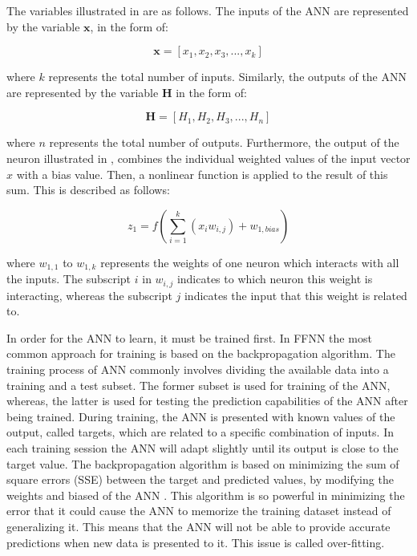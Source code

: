 The variables illustrated in  are as follows. The inputs of the ANN are represented by the variable $\mathbf{x}$, in the form of:

\begin{equation}
    \mathbf{x} = [x_1, x_2, x_3, ... , x_k ]
    \label{c6_neuronin}
\end{equation}

\noindent where $k$ represents the total number of inputs. Similarly, the outputs of the ANN are represented by the variable $\mathbf{H}$ in the form of:

\begin{equation}
    \mathbf{H} = [H_1, H_2, H_3, ... , H_n ]
    \label{c6_networkout}
\end{equation}

\noindent where $n$ represents the total number of outputs. Furthermore, the output of the neuron illustrated in , combines the individual weighted values of the input vector $x$ with a bias value. Then, a nonlinear function is applied to the result of this sum. This is described as follows:

\begin{equation}
    z_1 = f \left( \sum_{i=1}^k(x_i w_{i,j}) + w_{1,bias} \right)
\label{c6_neuronout}
\end{equation}

\noindent where $w_{1,1}$ to $w_{1,k}$ represents the weights of one neuron which interacts with all the inputs. The subscript $i$ in $w_{i,j}$ indicates to which neuron this weight is interacting, whereas the subscript $j$ indicates the input that this weight is related to.

In order for the ANN to learn, it must be trained first. In FFNN the most common approach for training is based on the backpropagation algorithm. The training process of ANN commonly involves dividing the available data into a training and a test subset. The former subset is used for training of the ANN, whereas, the latter is used for testing the prediction capabilities of the ANN after being trained. During training, the ANN is presented with known values of the output, called targets, which are related to a specific combination of inputs. In each training session the ANN will adapt slightly until its output is close to the target value. The backpropagation algorithm is based on minimizing the sum of square errors (SSE) between the target and predicted values, by modifying the weights and biased of the ANN \cite{zhang2003artificial}. This algorithm is so powerful in minimizing the error that it could cause the ANN to memorize the training dataset instead of generalizing it. This means that the ANN will not be able to provide accurate predictions when new data is presented to it. This issue is called over-fitting.

